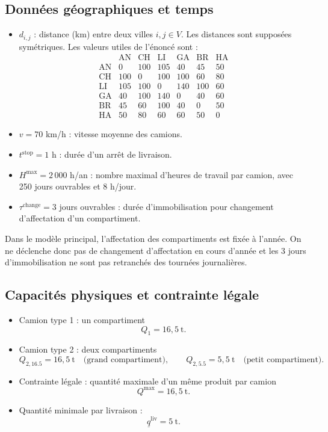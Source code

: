 \documentclass{article}
\begin{document}
\subsection{Données géographiques et temps}

\begin{itemize}
  \item $d_{i,j}$ : distance (km) entre deux villes $i,j \in V$. Les distances
  sont supposées symétriques. Les valeurs utiles de l'énoncé sont :
  \[
  \begin{array}{c|cccccc}
      & \mathrm{AN} & \mathrm{CH} & \mathrm{LI} & \mathrm{GA} & \mathrm{BR} & \mathrm{HA} \\
    \hline
    \mathrm{AN} & 0 & 100 & 105 & 40 & 45 & 50 \\
    \mathrm{CH} & 100 & 0 & 100 & 100 & 60 & 80 \\
    \mathrm{LI} & 105 & 100 & 0 & 140 & 100 & 60 \\
    \mathrm{GA} & 40 & 100 & 140 & 0 & 40 & 60 \\
    \mathrm{BR} & 45 & 60 & 100 & 40 & 0 & 50 \\
    \mathrm{HA} & 50 & 80 & 60 & 60 & 50 & 0
  \end{array}
  \]
  \item $v = 70$ km/h : vitesse moyenne des camions.
  \item $t^{\text{stop}} = 1$ h : durée d'un arrêt de livraison.
  \item $H^{\max} = 2\,000$ h/an : nombre maximal d'heures de travail par
  camion, avec 250 jours ouvrables et 8 h/jour.
  \item $\tau^{\text{change}} = 3$ jours ouvrables : durée d'immobilisation pour changement d'affectation d'un compartiment.
\end{itemize}

Dans le modèle principal, l'affectation des compartiments est fixée à l'année.
On ne déclenche donc pas de changement d'affectation en cours d'année et les
3 jours d'immobilisation ne sont pas retranchés des tournées journalières.

\subsection{Capacités physiques et contrainte légale}

\begin{itemize}
  \item Camion type 1 : un compartiment
  \[
    Q_1 = 16{,}5~\text{t}.
  \]
  \item Camion type 2 : deux compartiments
  \[
    Q_{2,16.5} = 16{,}5~\text{t} \quad\text{(grand compartiment)}, \qquad
    Q_{2,5.5} = 5{,}5~\text{t} \quad\text{(petit compartiment)}.
  \]
  \item Contrainte l\'egale : quantité maximale d'un m\^eme produit par camion
  \[
    Q^{\max} = 16{,}5~\text{t}.
  \]
  \item Quantité minimale par livraison :
  \[
    \underline{q}^{\text{liv}} = 5~\text{t}.
  \]
\end{itemize}
\end{document}
